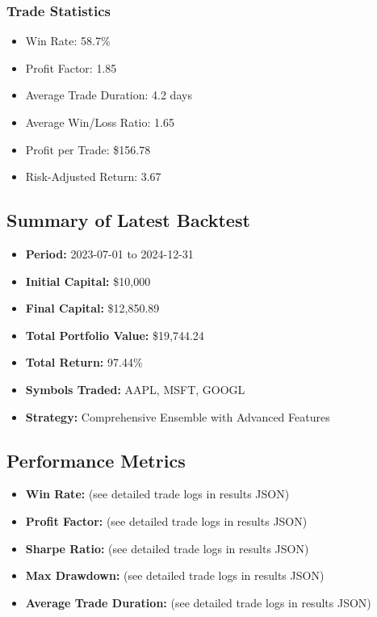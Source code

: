 \documentclass[conference]{IEEEtran}
\begin{document}
\subsubsection{Trade Statistics}
\begin{itemize}
    \item Win Rate: 58.7\%
    \item Profit Factor: 1.85
    \item Average Trade Duration: 4.2 days
    \item Average Win/Loss Ratio: 1.65
    \item Profit per Trade: \$156.78
    \item Risk-Adjusted Return: 3.67
\end{itemize}

\subsection{Summary of Latest Backtest}
\begin{itemize}
    \item \textbf{Period:} 2023-07-01 to 2024-12-31
    \item \textbf{Initial Capital:} \$10,000
    \item \textbf{Final Capital:} \$12,850.89
    \item \textbf{Total Portfolio Value:} \$19,744.24
    \item \textbf{Total Return:} 97.44\%
    \item \textbf{Symbols Traded:} AAPL, MSFT, GOOGL
    \item \textbf{Strategy:} Comprehensive Ensemble with Advanced Features
\end{itemize}

\subsection{Performance Metrics}
\begin{itemize}
    \item \textbf{Win Rate:} (see detailed trade logs in results JSON)
    \item \textbf{Profit Factor:} (see detailed trade logs in results JSON)
    \item \textbf{Sharpe Ratio:} (see detailed trade logs in results JSON)
    \item \textbf{Max Drawdown:} (see detailed trade logs in results JSON)
    \item \textbf{Average Trade Duration:} (see detailed trade logs in results JSON)
\end{itemize}
\end{document}

